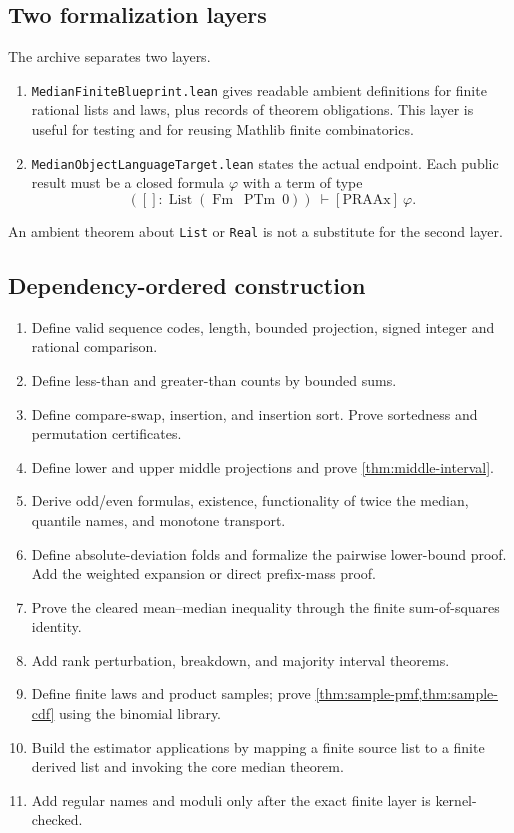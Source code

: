 \documentclass[11pt]{article}
\begin{document}
\subsection{Two formalization layers}

The archive separates two layers.

\begin{enumerate}
\item \texttt{MedianFiniteBlueprint.lean} gives readable ambient definitions
for finite rational lists and laws, plus records of theorem obligations.  This
layer is useful for testing and for reusing Mathlib finite combinatorics.
\item \texttt{MedianObjectLanguageTarget.lean} states the actual endpoint.
Each public result must be a closed formula $\varphi$ with a term of type
\[
 ([]:\operatorname{List}(\operatorname{Fm}\ \operatorname{PTm}\ 0))
 \ \vdash[\mathrm{PRAAx}]\ \varphi.
\]
\end{enumerate}

An ambient theorem about \texttt{List} or \texttt{Real} is not a substitute
for the second layer.

\subsection{Dependency-ordered construction}

\begin{enumerate}
\item Define valid sequence codes, length, bounded projection, signed integer
and rational comparison.
\item Define less-than and greater-than counts by bounded sums.
\item Define compare-swap, insertion, and insertion sort.  Prove sortedness and
permutation certificates.
\item Define lower and upper middle projections and prove
\cref{thm:middle-interval}.
\item Derive odd/even formulas, existence, functionality of twice the median,
quantile names, and monotone transport.
\item Define absolute-deviation folds and formalize the pairwise lower-bound
proof.  Add the weighted expansion or direct prefix-mass proof.
\item Prove the cleared mean--median inequality through the finite
sum-of-squares identity.
\item Add rank perturbation, breakdown, and majority interval theorems.
\item Define finite laws and product samples; prove
\cref{thm:sample-pmf,thm:sample-cdf} using the binomial library.
\item Build the estimator applications by mapping a finite source list to a
finite derived list and invoking the core median theorem.
\item Add regular names and moduli only after the exact finite layer is
kernel-checked.
\end{enumerate}
\end{document}
